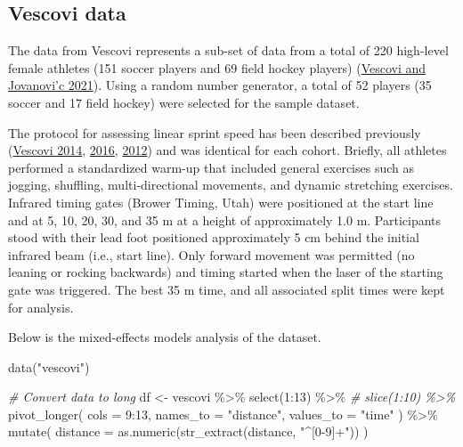 \documentclass[fleqn,10pt]{wlpeerj} %
\newenvironment{Shaded}{\begin{snugshade}}{\end{snugshade}}
\newcommand{\AttributeTok}[1]{\textcolor[rgb]{0.77,0.63,0.00}{#1}}
\newcommand{\CommentTok}[1]{\textcolor[rgb]{0.56,0.35,0.01}{\textit{#1}}}
\newcommand{\DecValTok}[1]{\textcolor[rgb]{0.00,0.00,0.81}{#1}}
\newcommand{\FunctionTok}[1]{\textcolor[rgb]{0.00,0.00,0.00}{#1}}
\newcommand{\NormalTok}[1]{#1}
\newcommand{\OtherTok}[1]{\textcolor[rgb]{0.56,0.35,0.01}{#1}}
\newcommand{\SpecialCharTok}[1]{\textcolor[rgb]{0.00,0.00,0.00}{#1}}
\newcommand{\StringTok}[1]{\textcolor[rgb]{0.31,0.60,0.02}{#1}}
\begin{document}
\normalsize

\hypertarget{vescovi-data}{%
\subsection{Vescovi data}\label{vescovi-data}}

The data from Vescovi represents a sub-set of data from a total of 220 high-level female athletes (151 soccer players and 69 field hockey players) (\protect\hyperlink{ref-vescoviSprintMechanicalCharacteristics2021}{Vescovi and Jovanovi'c 2021}). Using a random number generator, a total of 52 players (35 soccer and 17 field hockey) were selected for the sample dataset.

The protocol for assessing linear sprint speed has been described previously (\protect\hyperlink{ref-vescoviImpactMaximumSpeed2014}{Vescovi 2014}, \protect\hyperlink{ref-vescoviLocomotorHeartRateMetabolic2016}{2016}, \protect\hyperlink{ref-vescoviSprintSpeedCharacteristics2012}{2012}) and was identical for each cohort. Briefly, all athletes performed a standardized warm-up that included general exercises such as jogging, shuffling, multi-directional movements, and dynamic stretching exercises. Infrared timing gates (Brower Timing, Utah) were positioned at the start line and at 5, 10, 20, 30, and 35 m at a height of approximately 1.0 m. Participants stood with their lead foot positioned approximately 5 cm behind the initial infrared beam (i.e., start line). Only forward movement was permitted (no leaning or rocking backwards) and timing started when the laser of the starting gate was triggered. The best 35 m time, and all associated split times were kept for analysis.

Below is the mixed-effects models analysis of the dataset.

\small

\begin{Shaded}
\begin{Highlighting}[]
\FunctionTok{data}\NormalTok{(}\StringTok{"vescovi"}\NormalTok{)}

\CommentTok{\# Convert data to long}
\NormalTok{df }\OtherTok{\textless{}{-}}\NormalTok{ vescovi }\SpecialCharTok{\%\textgreater{}\%}
  \FunctionTok{select}\NormalTok{(}\DecValTok{1}\SpecialCharTok{:}\DecValTok{13}\NormalTok{) }\SpecialCharTok{\%\textgreater{}\%}
  \CommentTok{\# slice(1:10) \%\textgreater{}\%}
  \FunctionTok{pivot\_longer}\NormalTok{(}
    \AttributeTok{cols =} \DecValTok{9}\SpecialCharTok{:}\DecValTok{13}\NormalTok{,}
    \AttributeTok{names\_to =} \StringTok{"distance"}\NormalTok{,}
    \AttributeTok{values\_to =} \StringTok{"time"}
\NormalTok{  ) }\SpecialCharTok{\%\textgreater{}\%}
  \FunctionTok{mutate}\NormalTok{(}
    \AttributeTok{distance =} \FunctionTok{as.numeric}\NormalTok{(}\FunctionTok{str\_extract}\NormalTok{(distance, }\StringTok{"\^{}[0{-}9]+"}\NormalTok{))}
\NormalTok{  )}
\end{Highlighting}
\end{Shaded}
\end{document}
